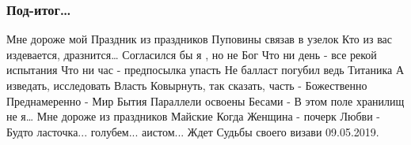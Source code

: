  
 
 

\subsubsection{Под-итог…}
\label{sec:poetry.rus.mykola_dudar_1950.pod_itog}

Мне дороже мой Праздник из праздников
Пуповины связав в узелок
Кто из вас издевается, дразнится…
Согласился бы я , но не Бог
Что ни день - все рекой испытания
Что ни час - предпосылка упасть
Не балласт погубил ведь Титаника
А изведать, исследовать Власть
Ковырнуть, так сказать, часть - Божественно
Преднамеренно - Мир Бытия
Параллели освоены Бесами -
В этом поле хранилищ не я…
Мне дороже из праздников Майские
Когда Женщина - почерк Любви -
Будто ласточка... голубем... аистом...
Ждет Судьбы своего визави
09.05.2019. 
